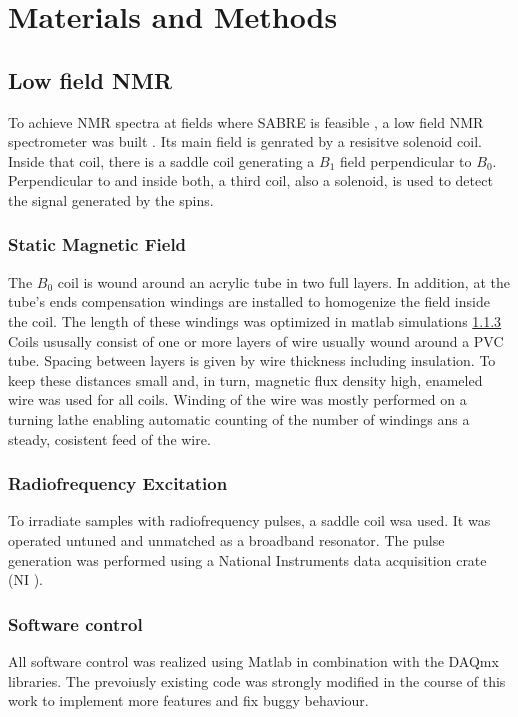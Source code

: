 \chapter{Materials and Methods}\label{chap:MaterialsAndMethods}
	\section{Low field NMR}
		To achieve NMR spectra at fields where SABRE is feasible , a low field NMR
		spectrometer was built . Its main field is genrated by a resisitve solenoid
		coil. Inside that coil, there is a saddle coil
		generating a $B_1$ field perpendicular to $B_0$. Perpendicular to and inside both, a third
		coil, also a solenoid, is used to detect the signal generated by the spins.
		\subsection{Static Magnetic Field}
			The $B_0$ coil is wound around an acrylic tube in two full layers. In addition, at the
			tube's ends compensation windings are installed to homogenize the field inside the coil.
			The length of these windings was optimized in matlab simulations \ref{} 
			Coils ususally consist of one or more layers of wire usually wound around a PVC tube. Spacing between layers is given by wire thickness including insulation. To keep  these distances small and, in turn, magnetic flux density high, enameled wire was used for all coils. Winding of the wire was mostly performed on a turning lathe enabling automatic counting of the number of windings ans a steady, cosistent feed of the wire.
		\subsection{Radiofrequency Excitation}
			To irradiate samples with radiofrequency pulses, a saddle coil  wsa
			used. It was operated untuned and unmatched as a broadband resonator. The pulse
			generation was performed using a National Instruments data acquisition crate (NI
			). 
		\subsection{Software control}
			All software control was realized using Matlab in combination with the DAQmx libraries.
			The prevoiusly existing code was strongly modified in the course of this work to
			implement more features and fix buggy behaviour.
